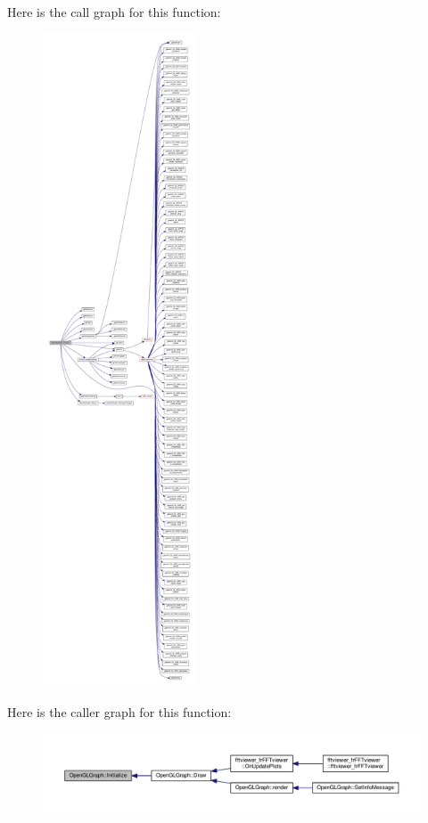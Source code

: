 Here is the call graph for this function\+:
\nopagebreak
\begin{figure}[H]
\begin{center}
\leavevmode
\includegraphics[height=550pt]{d9/d73/classOpenGLGraph_acaad9aa036130e655da7e5be30e6efec_cgraph}
\end{center}
\end{figure}




Here is the caller graph for this function\+:
\nopagebreak
\begin{figure}[H]
\begin{center}
\leavevmode
\includegraphics[width=350pt]{d9/d73/classOpenGLGraph_acaad9aa036130e655da7e5be30e6efec_icgraph}
\end{center}
\end{figure}


